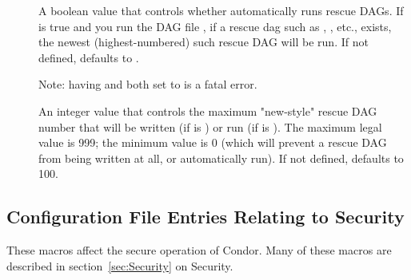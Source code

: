 \begin{description}
\item[]
\label{param:DAGManAutoRescue}
A boolean value that controls whether  automatically
runs rescue DAGs.  If  is true and you
run the DAG file , if a rescue dag such as
, , etc., exists, the newest
(highest-numbered) such rescue DAG will be run.
If not defined,  defaults to
.

Note: having  and
 both set to  is a
fatal error.

\item[]
\label{param:DAGManMaxRescueNum}
An integer value that controls the maximum "new-style" rescue DAG
number that will be written (if  is
) or run (if  is
).  The maximum legal value is 999; the minimum value
is 0 (which will prevent a rescue DAG from being written at all,
or automatically run).  If not defined,
 defaults to 100.

\end{description}

\subsection{\label{sec:Config-Security}Configuration File Entries
Relating to Security}

These macros affect the secure operation of Condor.
Many of these macros are described in
section~\ref{sec:Security} on Security.

